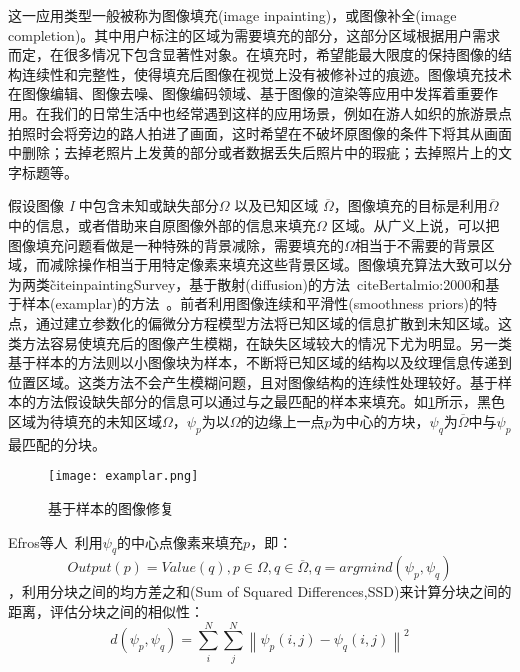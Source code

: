 这一应用类型一般被称为图像填充(image inpainting)，或图像补全(image completion)。其中用户标注的区域为需要填充的部分，这部分区域根据用户需求而定，在很多情况下包含显著性对象。在填充时，希望能最大限度的保持图像的结构连续性和完整性，使得填充后图像在视觉上没有被修补过的痕迹。图像填充技术在图像编辑、图像去噪、图像编码领域、基于图像的渲染等应用中发挥着重要作用。在我们的日常生活中也经常遇到这样的应用场景，例如在游人如织的旅游景点拍照时会将旁边的路人拍进了画面，这时希望在不破坏原图像的条件下将其从画面中删除；去掉老照片上发黄的部分或者数据丢失后照片中的瑕疵；去掉照片上的文字标题等。\par
假设图像 \emph{I} 中包含未知或缺失部分\(\Omega\) 以及已知区域 \(\overline{\Omega}\)，图像填充的目标是利用\(\overline{\Omega}\)中的信息，或者借助来自原图像外部的信息来填充\(\Omega\) 区域。从广义上说，可以把图像填充问题看做是一种特殊的背景减除，需要填充的\(\Omega\)相当于不需要的背景区域，而减除操作相当于用特定像素来填充这些背景区域。图像填充算法大致可以分为两类\~cite{inpaintingSurvey}，基于散射(diffusion)的方法~cite{Bertalmio:2000}和基于样本(examplar)的方法~\cite{Criminisi04regionfilling}。前者利用图像连续和平滑性(smoothness priors)的特点，通过建立参数化的偏微分方程模型方法将已知区域的信息扩散到未知区域。这类方法容易使填充后的图像产生模糊，在缺失区域较大的情况下尤为明显。另一类基于样本的方法则以小图像块为样本，不断将已知区域的结构以及纹理信息传递到位置区域。这类方法不会产生模糊问题，且对图像结构的连续性处理较好。基于样本的方法假设缺失部分的信息可以通过与之最匹配的样本来填充。如\ref{fig:examplar}所示，黑色区域为待填充的未知区域\(\Omega\)，$\psi_{p}$为以\(\Omega\)的边缘上一点$p$为中心的方块，$\psi_{q}$为\(\overline{\Omega}\)中与$\psi_{p}$最匹配的分块。
\begin{figure}[ht]
  \centering%
      {\texttt{[image: examplar.png]}}
  \caption{基于样本的图像修复}
  \label{fig:examplar}
\end{figure}
Efros等人~\cite{Efros}利用$\psi_{q}$的中心点像素来填充$p$，即：
$$Output(p)=Value(q),p\in \Omega, q\in \overline{\Omega},q=arg min d(\psi_{p},\psi_{q})$$
，利用分块之间的均方差之和(Sum of  Squared Differences,SSD)来计算分块之间的距离，评估分块之间的相似性：
$$d(\psi_{p},\psi_{q})=\sum_{i}^{N}\sum_{j}^{N}\left \| \psi_{p}(i,j)-\psi_{q}(i,j) \right \|^{2}$$
